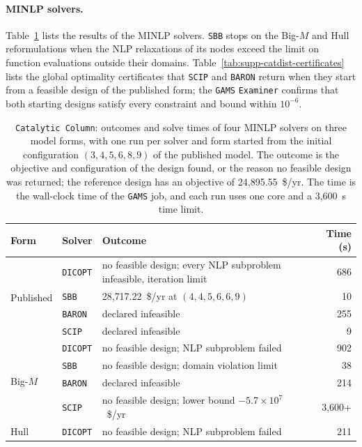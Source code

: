 \paragraph{MINLP solvers.}
Table~\ref{tab:supp-catdist-minlp} lists the results of the MINLP solvers.
\texttt{SBB} stops on the Big-\(M\) and Hull reformulations when the NLP relaxations of its nodes exceed the limit on function evaluations outside their domains.
Table~\ref{tab:supp-catdist-certificates} lists the global optimality certificates that \texttt{SCIP} and \texttt{BARON} return when they start from a feasible design of the published form; the \texttt{GAMS} \texttt{Examiner} confirms that both starting designs satisfy every constraint and bound within \(10^{-6}\).

\begin{table}[htbp]
\centering
\caption{\texttt{Catalytic Column}: outcomes and solve times of four MINLP solvers on three model forms, with one run per solver and form started from the initial configuration \((3,4,5,6,8,9)\) of the published model.
The outcome is the objective and configuration of the design found, or the reason no feasible design was returned; the reference design has an objective of 24,895.55~\$/yr.
The time is the wall-clock time of the \texttt{GAMS} job, and each run uses one core and a 3,600~s time limit.}
\label{tab:supp-catdist-minlp}
\footnotesize
\begin{threeparttable}
\begin{tabular}{@{}lllr@{}}\toprule
Form & Solver & Outcome & Time (s)\\\midrule
\multirow{4}{*}{Published} & \texttt{DICOPT} & no feasible design; every NLP subproblem infeasible, iteration limit & 686 \\
 & \texttt{SBB} & 28{,}717.22~\$/yr at \((4,4,5,6,6,9)\) & 10 \\
 & \texttt{BARON} & declared infeasible & 255 \\
 & \texttt{SCIP} & declared infeasible & 9 \\
\midrule
\multirow{4}{*}{Big-\(M\)} & \texttt{DICOPT} & no feasible design; NLP subproblem failed & 902 \\
 & \texttt{SBB} & no feasible design; domain violation limit & 38 \\
 & \texttt{BARON} & declared infeasible & 214 \\
 & \texttt{SCIP} & no feasible design; lower bound \(-5.7\times10^{7}\)~\$/yr & 3{,}600+ \\
\midrule
\multirow{4}{*}{Hull} & \texttt{DICOPT} & no feasible design; NLP subproblem failed & 211 \\

\end{tabular}
\end{threeparttable}
\end{table}
